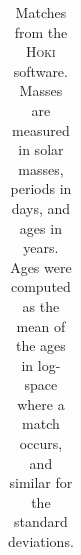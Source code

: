 \begin{table}
\begin{tabular}{c|l|c|c|c|c||c|c}
         \bottomrule
    \end{tabular}
    \renewcommand{\arraystretch}{\basestretch}
    \caption[Matches from the \textsc{Hoki} \citep{Stevance:2020a} software.]{Matches from the \textsc{Hoki} \citep{Stevance:2020a} software. Masses are measured in solar masses, periods in days, and ages in years. Ages were computed as the mean of the ages in log-space where a match occurs, and similar for the standard deviations.}
    \label{tab:hoki_matches}
\end{table}